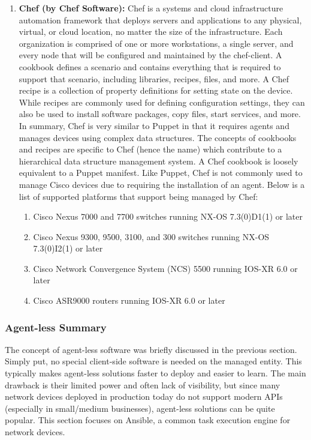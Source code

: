 \begin{enumerate}
  \item \textbf{Chef (by Chef Software):} Chef is a systems and cloud
  infrastructure automation framework that deploys servers and applications to
  any physical, virtual, or cloud location, no matter the size of the
  infrastructure. Each organization is comprised of one or more workstations,
  a single server, and every node that will be configured and maintained by
  the chef-client. A cookbook defines a scenario and contains everything that
  is required to support that scenario, including libraries, recipes, files,
  and more. A Chef recipe is a collection of property definitions for setting
  state on the device. While recipes are commonly used for defining
  configuration settings, they can also be used to install software packages,
  copy files, start services, and more. \\

  In summary, Chef is very similar to Puppet in that it requires agents and
  manages devices using complex data structures. The concepts of cookbooks and
  recipes are specific to Chef (hence the name) which contribute to a
  hierarchical data structure management system. A Chef cookbook is loosely
  equivalent to a Puppet manifest. Like Puppet, Chef is not commonly used to
  manage Cisco devices due to requiring the installation of an agent. Below is
  a list of supported platforms that support being managed by Chef:

  \begin{enumerate}
    \item Cisco Nexus 7000 and 7700 switches running NX-OS 7.3(0)D1(1) or later
    \item Cisco Nexus 9300, 9500, 3100, and 300 switches running NX-OS
	7.3(0)I2(1) or later
    \item Cisco Network Convergence System (NCS) 5500 running IOS-XR 6.0 or later
    \item Cisco ASR9000 routers running IOS-XR 6.0 or later
  \end{enumerate}
\end{enumerate}

\subsubsection{Agent-less Summary}
The concept of agent-less software was briefly discussed in the previous
section. Simply put, no special client-side software is needed on the managed
entity. This typically makes agent-less solutions faster to deploy and easier
to learn. The main drawback is their limited power and often lack of
visibility, but since many network devices deployed in production today do not
support modern APIs (especially in small/medium businesses), agent-less
solutions can be quite popular. This section focuses on Ansible, a common task
execution engine for network devices.


